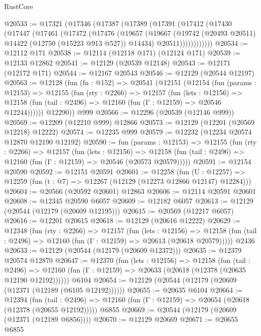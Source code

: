 \begin{lexlean}{RustCore}
\begin{coremodule}
@20533 := @17321
    (@17346
      (@17387
        (@17389
          (@17391
            (@17412
              (@17430
                (@17447
                  (@17461
                    (@17472
                      (@17476
                        (@19657
                          (@19667
                            (@19742 (@20493 @20511) @14422 (@12750 (@15223 @913 @527)) @14434)
                            @20511))))))))))))
@20534 := @12112 @171
@20538 := @12114 (@12118 @171) (@12124 @171)
@20539 := @12133 @12862
@20541 := @12129 (@20539 @12148)
@20543 := @12171 (@12172 @171)
@20544 := @12167 @20543
@20546 := @12129 (@20544 @12197)
@20563 := @12128
    (fun (fn : @152) =>
    @20541
      (@12151
        (@12154
          (fun (params : @12153) =>
          @12155
            (fun (rty : @2266) =>
            @12157
              (fun (lets : @12156) =>
              @12158 (fun (tail : @2496) => @12160 (fun (Γ : @12159) => @20546 @12244))))))
        @12290))
    @999
@20566 := @12296 (@20539 (@12146 @999))
@20569 := @12209 (@12210 @999) @12866
@20573 := @12129 (@12201 (@20569 @12218) @12222)
@20574 := @12235 @999
@20579 := @12232 (@12234 @20574 @12870 @12190 @12192)
@20590 := fun (params : @12153) =>
  @12155
    (fun (rty : @2266) =>
    @12157
      (fun (lets : @12156) =>
      @12158 (fun (tail : @2496) => @12160 (fun (Γ : @12159) => @20546 (@20573 @20579)))))
@20591 := @12154 @20590
@20592 := @12151 @20591
@20601 := @12258
    (fun (U : @12257) => @12259 (fun (t : @7) => @12267 (@12129 (@12273 @12866 @12147) @12284)))
@20604 := @20566 (@20592 @20601) @12863
@20606 := @12114 @20591 @20601
@20608 := @12345 @20590 @6057
@20609 := @12182 @6057
@20613 := @12129 (@20544 (@12179 (@20609 @12195)))
@20615 := @20569 (@12217 @6057)
@20616 := @12201 @20615
@20618 := @12129 (@20616 @12222)
@20629 := @12348
    (fun (rty : @2266) =>
    @12157
      (fun (lets : @12156) =>
      @12158 (fun (tail : @2496) => @12160 (fun (Γ : @12159) => @20613 (@20618 @20579)))))
    @2436
@20633 := @12129 (@20544 (@12179 (@20609 @12372)))
@20635 := @12379 @20574 @12870
@20647 := @12370
    (fun (lets : @12156) =>
    @12158
      (fun (tail : @2496) =>
      @12160 (fun (Γ : @12159) => @20633 (@20618 (@12378 (@20635 @12190 @12192))))))
    @6104
@20654 := @12129 (@20544 (@12179 (@20609 (@12371 (@12189 (@6105 @12192))))))
@20655 := @20635 @6104
@20664 := @12394
    (fun (tail : @2496) => @12160 (fun (Γ : @12159) => @20654 (@20618 (@12378 (@20655 @12192)))))
    @6855
@20669 := @20544 (@12179 (@20609 (@12371 (@12189 @6856))))
@20670 := @12129 @20669
@20671 := @20655 @6855

\end{coremodule}
\end{lexlean}
